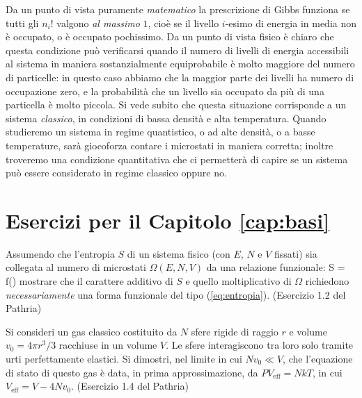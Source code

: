 Da un punto di vista puramente {\em matematico} la prescrizione di Gibbs funziona se tutti gli $n_{i}!$ valgono {\em al massimo} $1$, cioè se il livello $i$-esimo di energia in media non è occupato, o è occupato pochissimo. Da un punto di vista fisico è chiaro che questa condizione può verificarsi quando il numero di livelli di energia accessibili al sistema in maniera sostanzialmente equiprobabile è molto maggiore del numero di particelle: in questo caso abbiamo che la maggior parte dei livelli ha numero di occupazione zero, e la probabilità che un livello sia occupato da più di una particella è molto piccola. Si vede subito che questa situazione corrisponde a un sistema {\em classico}, in condizioni di bassa densità e alta temperatura. Quando studieremo un sistema in regime quantistico, o ad alte densità, o a basse temperature, sarà giocoforza contare i microstati in maniera corretta; inoltre troveremo una condizione quantitativa che ci permetterà di capire se un sistema può essere considerato in regime classico oppure no.

\section{Esercizi per il Capitolo \ref{cap:basi}}

\begin{Exercise}[label={ex2:relaSOmega}, title={Relazione funzionale tra entropia e numero di microstati}]
Assumendo che l'entropia $S$ di un sistema fisico (con $E$, $N$ e $V$ fissati) sia collegata al numero di microstati $\Omega(E,N,V)$ da una relazione funzionale:
\be
S = f(\Omega)
\ee
mostrare che il carattere additivo di $S$ e quello moltiplicativo di $\Omega$ richiedono {\em necessariamente} una forma funzionale del tipo (\ref{eq:entropia}). 
(Esercizio 1.2 del Pathria)
\end{Exercise}


\begin{Exercise}[label={ex2:sfere}, title={Prima correzione all'equazione di stato}]
Si consideri un gas classico costituito da $N$ sfere rigide di raggio $r$ e volume $v_0 = 4\pi r^3/3$ racchiuse in un volume $V$. Le sfere interagiscono tra loro solo tramite urti perfettamente elastici. Si dimostri, nel limite in cui $Nv_0 \ll V$, che l'equazione di stato di questo gas è data, in prima approssimazione, da $PV_{\textrm{eff}} = NkT$, in cui $V_{\textrm{eff}} = V-4Nv_0$.
(Esercizio 1.4 del Pathria)
\end{Exercise}

